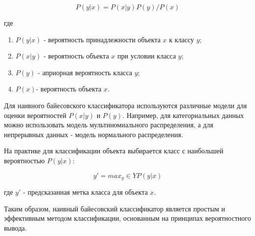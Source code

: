 \documentclass[12pt]{report}
\begin{document}
\begin{equation}
  P(y|x) = P(x|y)P(y)/P(x)  
\end{equation}
    
где 
\begin{enumerate}
    \item $P(y|x)$ - вероятность принадлежности объекта $x$ к классу $y$;
    \item $P(x|y)$ - вероятность объекта $x$ при условии класса $y$;
    \item $P(y)$ - априорная вероятность класса $y$;
    \item $P(x) $- вероятность объекта $x$.
\end{enumerate}

Для наивного байесовского классификатора используются различные модели для оценки вероятностей $P(x|y)$ и $P(y)$. Например, для категориальных данных можно использовать модель мультиномиального распределения, а для непрерывных данных - модель нормального распределения.

На практике для классификации объекта выбирается класс с наибольшей вероятностью $P(y|x)$:

\begin{equation}
    y' = max_y \in Y P(y|x)
\end{equation}

где $y'$ - предсказанная метка класса для объекта $x$.

Таким образом, наивный байесовский классификатор является простым и эффективным методом классификации, основанным на принципах вероятностного вывода.
\end{document}
